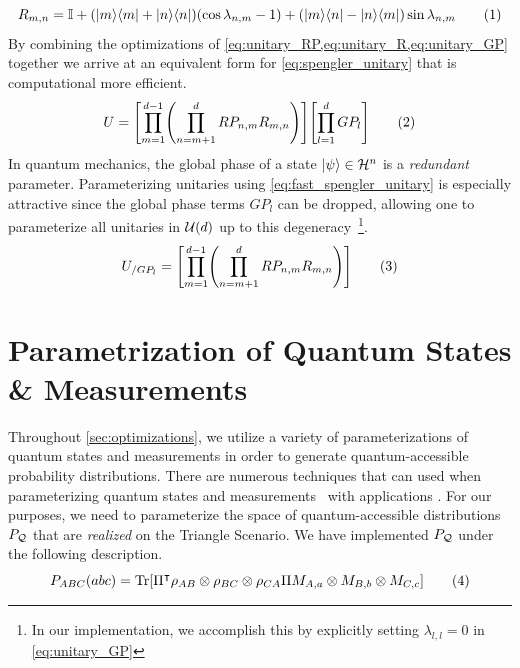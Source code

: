 \documentclass[aps, 10pt, english, twoside, pra, nofootinbib, longbibliography]{revtex4-1}
\theoremstyle{plain}
\theoremstyle{definition}
\theoremstyle{remark}
\newcommand{\netperm}{\Pi}
\newcommand{\Hilb}{\mathcal{H}}
\newcommand{\tcdot}{} %
\begin{document}
    \[ R_{m,n} = \mathbb{I} + \br{\ket{m}\bra{m} + \ket{n}\bra{n}} \br{\cos\lambda_{n,m} - 1} + \br{\ket{m}\bra{n} - \ket{n}\bra{m}} \sin\lambda_{n,m} \eq \label{eq:unitary_R} \]
    By combining the optimizations of \cref{eq:unitary_RP,eq:unitary_R,eq:unitary_GP} together we arrive at an equivalent form for \cref{eq:spengler_unitary} that is computational more efficient.
    \[ U = \bs{\prod_{m=1}^{d-1} \br{\prod_{n=m+1}^{d} RP_{n,m}R_{m,n}}} \tcdot \bs{\prod_{l=1}^{d} GP_l} \eq \label{eq:fast_spengler_unitary} \]
    In quantum mechanics, the global phase of a state $\ket{\psi} \in \Hilb^n$ is a \textit{redundant} parameter. Parameterizing unitaries using \cref{eq:fast_spengler_unitary} is especially attractive since the global phase terms $GP_l$ can be dropped, allowing one to parameterize all unitaries in $\mathcal{U}\br{d}$ up to this degeneracy~\cite{Spengler_2010_Unitary}\footnote{In our implementation, we accomplish this by explicitly setting $\lambda_{l,l} = 0$ in \cref{eq:unitary_GP}}.
    \[ U_{/ GP_l} = \bs{\prod_{m=1}^{d-1} \br{\prod_{n=m+1}^{d} RP_{n,m}R_{m,n}}} \eq \label{eq:fast_spengler_unitary_gp} \]

    \section{Parametrization of Quantum States \& Measurements}
    \label{sec:param_quantum_states}
    Throughout \cref{sec:optimizations}, we utilize a variety of parameterizations of quantum states and measurements in order to generate quantum-accessible probability distributions. There are numerous techniques that can used when parameterizing quantum states and measurements~\cite{Petz_2015, Hedemann_2013,Spengler_2010_Unitary,Fujii_2005,James_2001} with applications . For our purposes, we need to parameterize the space of quantum-accessible distributions $\prob[\mathcal{Q}]$ that are \textit{realized} on the Triangle Scenario. We have implemented $\prob[\mathcal{Q}]$ under the following description.
    \[ \prob[ABC]\br{abc} = \Tr\bs{\netperm^\intercal \rho_{AB}\otimes\rho_{BC}\otimes\rho_{CA} \netperm M_{A,a}\otimes M_{B,b} \otimes M_{C,c}} \eq \label{eq:triangle_quantum_distributions} \]
\end{document}
